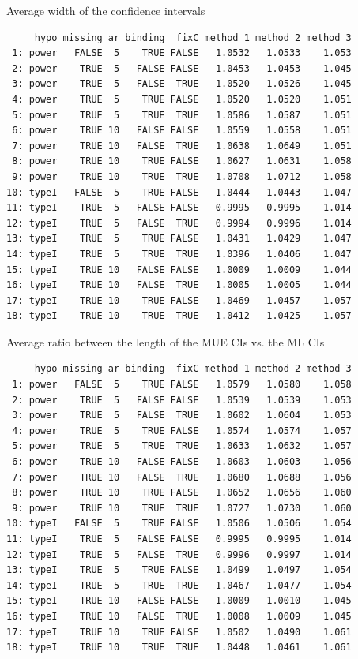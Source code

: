 \documentclass[12pt]{article}
\begin{document}
Average width of the confidence intervals
\begin{verbatim}
     hypo missing ar binding  fixC method 1 method 2 method 3
 1: power   FALSE  5    TRUE FALSE   1.0532   1.0533    1.053
 2: power    TRUE  5   FALSE FALSE   1.0453   1.0453    1.045
 3: power    TRUE  5   FALSE  TRUE   1.0520   1.0526    1.045
 4: power    TRUE  5    TRUE FALSE   1.0520   1.0520    1.051
 5: power    TRUE  5    TRUE  TRUE   1.0586   1.0587    1.051
 6: power    TRUE 10   FALSE FALSE   1.0559   1.0558    1.051
 7: power    TRUE 10   FALSE  TRUE   1.0638   1.0649    1.051
 8: power    TRUE 10    TRUE FALSE   1.0627   1.0631    1.058
 9: power    TRUE 10    TRUE  TRUE   1.0708   1.0712    1.058
10: typeI   FALSE  5    TRUE FALSE   1.0444   1.0443    1.047
11: typeI    TRUE  5   FALSE FALSE   0.9995   0.9995    1.014
12: typeI    TRUE  5   FALSE  TRUE   0.9994   0.9996    1.014
13: typeI    TRUE  5    TRUE FALSE   1.0431   1.0429    1.047
14: typeI    TRUE  5    TRUE  TRUE   1.0396   1.0406    1.047
15: typeI    TRUE 10   FALSE FALSE   1.0009   1.0009    1.044
16: typeI    TRUE 10   FALSE  TRUE   1.0005   1.0005    1.044
17: typeI    TRUE 10    TRUE FALSE   1.0469   1.0457    1.057
18: typeI    TRUE 10    TRUE  TRUE   1.0412   1.0425    1.057
\end{verbatim}

Average ratio between the length of the MUE CIs vs. the ML CIs
\begin{verbatim}
     hypo missing ar binding  fixC method 1 method 2 method 3
 1: power   FALSE  5    TRUE FALSE   1.0579   1.0580    1.058
 2: power    TRUE  5   FALSE FALSE   1.0539   1.0539    1.053
 3: power    TRUE  5   FALSE  TRUE   1.0602   1.0604    1.053
 4: power    TRUE  5    TRUE FALSE   1.0574   1.0574    1.057
 5: power    TRUE  5    TRUE  TRUE   1.0633   1.0632    1.057
 6: power    TRUE 10   FALSE FALSE   1.0603   1.0603    1.056
 7: power    TRUE 10   FALSE  TRUE   1.0680   1.0688    1.056
 8: power    TRUE 10    TRUE FALSE   1.0652   1.0656    1.060
 9: power    TRUE 10    TRUE  TRUE   1.0727   1.0730    1.060
10: typeI   FALSE  5    TRUE FALSE   1.0506   1.0506    1.054
11: typeI    TRUE  5   FALSE FALSE   0.9995   0.9995    1.014
12: typeI    TRUE  5   FALSE  TRUE   0.9996   0.9997    1.014
13: typeI    TRUE  5    TRUE FALSE   1.0499   1.0497    1.054
14: typeI    TRUE  5    TRUE  TRUE   1.0467   1.0477    1.054
15: typeI    TRUE 10   FALSE FALSE   1.0009   1.0010    1.045
16: typeI    TRUE 10   FALSE  TRUE   1.0008   1.0009    1.045
17: typeI    TRUE 10    TRUE FALSE   1.0502   1.0490    1.061
18: typeI    TRUE 10    TRUE  TRUE   1.0448   1.0461    1.061
\end{verbatim}
\end{document}
